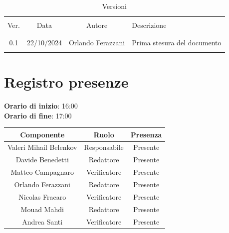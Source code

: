 \documentclass[italian, 12pt]{article}
\begin{document}
\pagestyle{mystyle}


\begin{table}[!h]
	\caption{Versioni}
	\begin{center}
		\begin{tabular}{ c c c p{9cm}}
			\hline \\[-2ex]
			Ver. & Data & Autore & Descrizione \\
			\\[-2ex] \hline \\[-1.5ex]
			0.1 & 22/10/2024 & Orlando Ferazzani& Prima stesura del documento\\
			\\[-1.5ex] \hline
		\end{tabular}
	\end{center}
\end{table}


\tableofcontents
\newpage


\section{Registro presenze}

\textbf{Orario di inizio}: 16:00\\
\textbf{Orario di fine}: 17:00\\


\begin{flushleft}
	\begin{table}[!h]
	\begin{tabular}{ |c|c|c| } 
		\hline
		\textbf{Componente} & \textbf{Ruolo} & \textbf{Presenza} \\
  \hline 
		Valeri Mihail Belenkov & Responsabile & Presente \\ 
		Davide Benedetti 	& Redattore & Presente \\
		Matteo Campagnaro	& Verificatore & Presente \\
		Orlando Ferazzani 	& Redattore & Presente \\
		Nicolas Fracaro 	& Verificatore & Presente \\
		Mouad Mahdi		    & Redattore & Presente \\ 
		Andrea Santi 	    & Verificatore & Presente \\
		\hline
	\end{tabular}
	\end{table}
	\end{flushleft}
\end{document}
